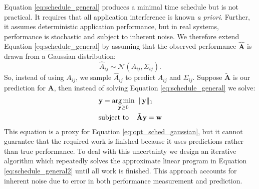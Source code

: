 Equation \eqref{eq:schedule_general} produces a minimal time schedule
but is not practical.  It requires that all application interference
is known \emph{a priori}.  Further, it assumes deterministic
application performance, but in real systems, performance is
stochastic and subject to inherent noise.  We therefore extend
Equation \eqref{eq:schedule_general} by assuming that the observed
performance $\hat{\mathbf{A}}$ is drawn from a Gaussian distribution:
\begin{equation}
\label{eq:opt_sched_gaussian}
\hat{A}_{ij} \sim \mathcal{N}(A_{ij},\Sigma_{ij}).
\end{equation}
So, instead of using $A_{ij}$, we sample $\hat{A}_{ij}$ to predict
$A_{ij}$ and $\Sigma_{ij}$.  Suppose $\tilde{\mathbf{A}}$ is our
prediction for $\mathbf{A}$, then instead of solving Equation
\eqref{eq:schedule_general} we solve:
\begin{equation}
\begin{aligned}
\centering
			\label{eq:schedule_general2}
			&   \y =\underset{  \y \geq 0}{\argmin} \;\;   \| \y \|_1\\
                        &  \text{subject to} \;\;\;\; \tilde{\mathbf{A}} \y = \w
\end{aligned}
\end{equation}
This equation is a proxy for Equation \eqref{eq:opt_sched_gaussian},
but it cannot guarantee that the required work is finished because it
uses predictions rather than true performance.  To deal with this
uncertainty we design an iterative algorithm which repeatedly solves
the approximate linear program in Equation
\eqref{eq:schedule_general2} until all work is finished.  This
approach accounts for inherent noise due to error in both performance
measurement and prediction.

